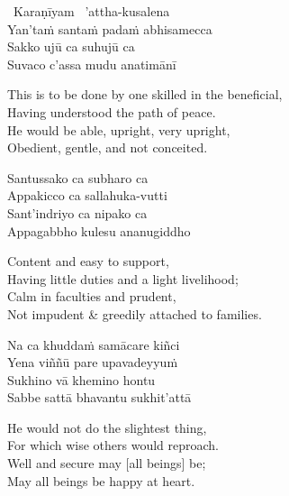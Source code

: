 \begin{pali-hangtogether}
  \anglebracketleft\ \hspace{-0.5mm}Karaṇīyam \hspace{-0.5mm}\anglebracketright\ 'attha-kusalena\\
  Yan'taṁ santaṁ padaṁ abhisamecca\\
  Sakko ujū ca suhujū ca\\
  Suvaco c'assa mudu anatimānī
\end{pali-hangtogether}

\begin{english-verses}
  This is to be done by one skilled in the beneficial,\\
  Having understood the path of peace.\\
  He would be able, upright, very upright,\\
  Obedient, gentle, and not conceited.
\end{english-verses}

\begin{pali-hang-continued}
  Santussako ca subharo ca\\
  Appakicco ca sallahuka-vutti\\
  Sant'indriyo ca nipako ca\\
  Appagabbho kulesu ananugiddho
\end{pali-hang-continued}

\begin{english-verses}
  Content and easy to support,\\
  Having little duties and a light livelihood;\\
  Calm in faculties and prudent,\\
  Not impudent \& greedily attached to families.
\end{english-verses}

\begin{pali-hang-continued}
  Na ca khuddaṁ samācare kiñci\\
  Yena viññū pare upavadeyyuṁ\\
  Sukhino vā khemino hontu\\
  Sabbe sattā bhavantu sukhit'attā
\end{pali-hang-continued}

\begin{english-verses}
  He would not do the slightest thing,\\
  For which wise others would reproach.\\
  Well and secure may [all beings] be;\\
  May all beings be happy at heart.
\end{english-verses}

